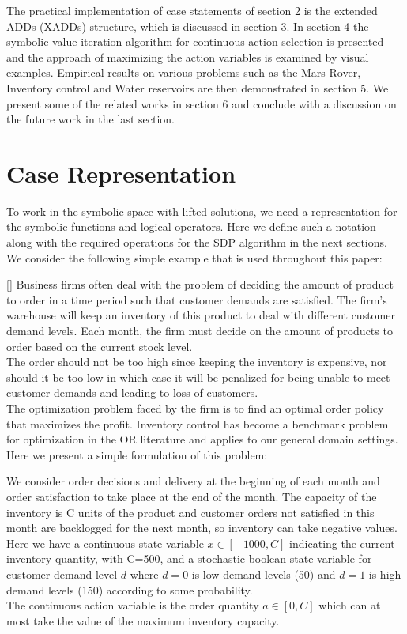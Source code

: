 \documentclass[letterpaper]{article}
\renewcommand{\-}{\text{-}}
\begin{document}
The practical implementation of case statements of section 2 is the extended ADDs (XADDs) structure, which is discussed in section 3. In section 4 the symbolic value iteration algorithm for continuous action selection is presented and the approach of maximizing the action variables is examined by visual examples. Empirical results on various problems such as the Mars Rover, Inventory control and Water reservoirs are then demonstrated in section 5. We present some of the related works in section 6 and conclude with a discussion on the future work in the last section. 

\section{Case Representation}

To work in the symbolic space with lifted solutions, we need a representation for the symbolic functions and logical operators. Here we define such a notation along with the required operations for the SDP algorithm in the next sections. We consider the following simple example that is used throughout this paper:

[\InventoryControl] Business firms often deal with the problem of deciding  the amount of product to order in a time period such that customer demands are satisfied. 
The firm's warehouse will keep an inventory of this product to deal with different customer demand levels. Each month, the firm must decide on the amount of products 
to order based on the current stock level. \\
The order should not be too high since keeping the inventory is expensive, nor should it be too low in which case
it will be penalized for being unable to meet customer demands and leading to loss of customers. 
\\The optimization problem faced by the firm is to find an optimal 
order policy that maximizes the profit. Inventory control has become a benchmark problem for optimization in the OR literature and applies to our general domain settings. Here we present a simple formulation of this problem: \\

\begin{example*}[\InventoryControl]
We consider order decisions and delivery at the beginning of each month and order satisfaction to take place at the end of the month. 
The capacity of the inventory is C units of the product and customer orders not satisfied in this month are backlogged for the next month, so inventory can take negative values.  
\\Here we have a continuous state variable $x \in [-1000,C]$ indicating the current inventory quantity, with C=500, and a stochastic boolean state variable for customer demand level $d$ where $d=0$ is low demand levels (50) and $d=1$ is high demand levels (150) according to some probability. \\
The continuous action variable is the order quantity $a \in [0,C]$ which can at most take the value of the maximum inventory capacity. \\
\end{example*}
\end{document}
